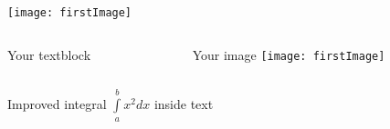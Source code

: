 \documentclass[notes,compress]{beamer}
\begin{document}
    \begin{frame}
        \texttt{[image: firstImage]}
    \end{frame}

    \begin{frame}
    	\begin{columns}[T]
        	\begin{column}{.5\textwidth}
            	Your textblock
           	
        	\end{column}
        	\begin{column}{.5\textwidth}
            	\begin{block}{Your image}
                	\texttt{[image: firstImage]}
            	\end{block}
        	\end{column}
    	\end{columns}
	\end{frame}

    \begin{frame}
        Improved integral $\int\limits_{a}^{b} x^2 dx$ inside text
    \end{frame}
\end{document}
